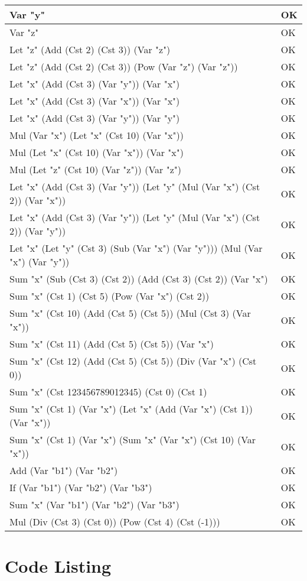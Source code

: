 \documentclass[12pt,a4paper]{article}
\begin{document}
\begin{tabularx}{\linewidth}[!htbp]{X|l}
     \hline
    Var "y" & OK \\
     \hline
    Var "z" & OK \\
     \hline
    Let "z" (Add (Cst 2) (Cst 3)) (Var "z") & OK \\
     \hline
    Let "z" (Add (Cst 2) (Cst 3)) (Pow (Var "z") (Var "z")) & OK \\
     \hline
    Let "x" (Add (Cst 3) (Var "y")) (Var "x") & OK \\
     \hline
    Let "x" (Add (Cst 3) (Var "x")) (Var "x") & OK \\
     \hline
    Let "x" (Add (Cst 3) (Var "y")) (Var "y") & OK \\
     \hline
    Mul (Var "x") (Let "x" (Cst 10) (Var "x")) & OK \\
     \hline
    Mul (Let "x" (Cst 10) (Var "x")) (Var "x") & OK \\
     \hline
    Mul (Let "z" (Cst 10) (Var "z")) (Var "z") & OK \\
     \hline
    Let "x" (Add (Cst 3) (Var "y")) (Let "y" (Mul (Var "x") (Cst 2)) (Var "x")) & OK \\
     \hline
    Let "x" (Add (Cst 3) (Var "y")) (Let "y" (Mul (Var "x") (Cst 2)) (Var "y")) & OK \\
     \hline
    Let "x" (Let "y" (Cst 3) (Sub (Var "x") (Var "y"))) (Mul (Var "x") (Var "y")) & OK \\
     \hline
    Sum "x" (Sub (Cst 3) (Cst 2)) (Add (Cst 3) (Cst 2)) (Var "x") & OK \\
     \hline
    Sum "x" (Cst 1) (Cst 5) (Pow (Var "x") (Cst 2)) & OK \\
     \hline
    Sum "x" (Cst 10) (Add (Cst 5) (Cst 5)) (Mul (Cst 3) (Var "x")) & OK \\
     \hline
    Sum "x" (Cst 11) (Add (Cst 5) (Cst 5)) (Var "x") & OK \\
     \hline
    Sum "x" (Cst 12) (Add (Cst 5) (Cst 5)) (Div (Var "x") (Cst 0)) & OK \\
     \hline
    Sum "x" (Cst 123456789012345) (Cst 0) (Cst 1) & OK \\
     \hline
    Sum "x" (Cst 1) (Var "x") (Let "x" (Add (Var "x") (Cst 1)) (Var "x")) & OK \\
     \hline
    Sum "x" (Cst 1) (Var "x") (Sum "x" (Var "x") (Cst 10) (Var "x")) & OK \\
     \hline
    Add (Var "b1") (Var "b2") & OK \\
     \hline
    If (Var "b1") (Var "b2") (Var "b3") & OK \\
     \hline
    Sum "x" (Var "b1") (Var "b2") (Var "b3") & OK \\
     \hline
    Mul (Div (Cst 3) (Cst 0)) (Pow (Cst 4) (Cst (-1))) & OK \\
     \hline
\end{tabularx}

\appendix
\section{Code Listing}

\inputminted{haskell}{src/Arithmetic.hs}
\end{document}
